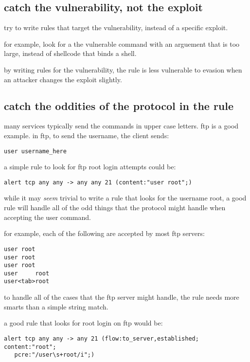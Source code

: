 \documentclass[english]{report}
\begin{document}
\subsection{catch the vulnerability, not the exploit}

try to write rules that target the vulnerability, instead of a specific exploit.

for example, look for a the vulnerable command with an arguement that is too
large, instead of shellcode that binds a shell.

by writing rules for the vulnerability, the rule is less vulnerable to evasion
when an attacker changes the exploit slightly.

\subsection{catch the oddities of the protocol in the rule}

many services typically send the commands in upper case letters.  ftp is a good example.  in ftp, to send the username, the client sends:

\begin{verbatim}
user username_here
\end{verbatim}

a simple rule to look for ftp root login attempts could be:

\begin{verbatim}
alert tcp any any -> any any 21 (content:"user root";)
\end{verbatim}

while it may \emph{seem} trivial to write a rule that looks for the username
root, a good rule will handle all of the odd things that the protocol might
handle when accepting the user command.

for example, each of the following are accepted by most ftp servers:

\begin{verbatim}
user root
user root
user root
user     root
user<tab>root
\end{verbatim}

to handle all of the cases that the ftp server might handle, the rule needs
more smarts than a simple string match.

a good rule that looks for root login on ftp would be:

\begin{verbatim}
alert tcp any any -> any 21 (flow:to_server,established; content:"root";
   pcre:"/user\s+root/i";)
\end{verbatim}
\end{document}
